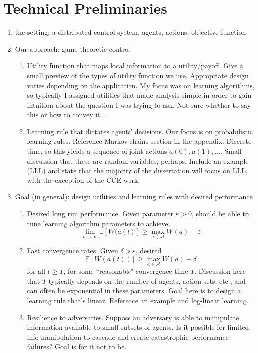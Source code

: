 \section{Technical Preliminaries}




\begin{enumerate}
    \item the setting: a distributed control system. agents, actions, objective function
    \item Our approach: game theoretic control
    \begin{enumerate}
        \item Utility function that maps local information to a utility/payoff. Give a small preview of the types of utility function we use. Appropriate design varies depending on the application. My focus was on learning algorithms, so typically I assigned utilities that made analysis simple in order to gain intuition about the question I was trying to ask. Not sure whether to say this or how to convey it....
        \item Learning rule that dictates agents' decisions. Our focus is on probabilistic learning rules. Reference Markov chains section in the appendix. Discrete time, so this yields a sequence of joint actions $a(0),a(1),\ldots.$ Small discussion that these are random variables, perhaps. Include an example (LLL) and state that the majority of the dissertation will focus on LLL, with the exception of the CCE work.
    \end{enumerate}
    \item Goal (in general): design utilities and learning rules with desired performance
    \begin{enumerate}
        \item Desired long run performance. Given parameter $\varepsilon>0$, should be able to tune learning algorithm parameters to achieve:
        $$\lim_{t\to\infty}\mathbb{E}[ W(a(t)]\geq \max_{a\in\mathcal{A}}W(a) - \varepsilon$$
        \item Fast convergence rates. Given $\delta > \varepsilon$, desired
        $$\mathbb{E}[W(a(t))]\geq \max_{a\in\mathcal{A}}W(a) - \delta$$
        for all $t\geq T$, for some ``reasonable" convergence time $T$. Discussion here that $T$ typically depends on the number of agents, action sets, etc., and can often be exponential in these parameters. Goal here is to design a learning rule that's linear. Reference an example and log-linear learning.
        \item Resilience to adversaries. Suppose an adversary is able to manipulate information available to small subsets of agents. Is it possible for limited info manipulation to cascade and create catastrophic performance failures? Goal is for it not to be.
    \end{enumerate}
\end{enumerate}


